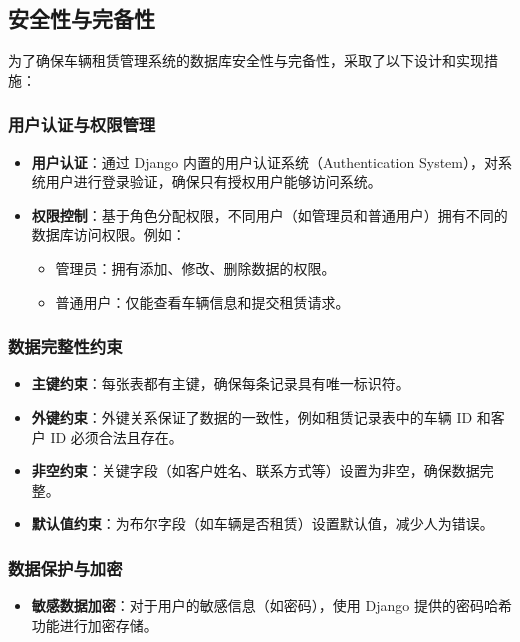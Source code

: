 \documentclass[UTF8,a4paper,12pt]{ctexart}
\begin{document}
\subsection{安全性与完备性}


为了确保车辆租赁管理系统的数据库安全性与完备性，采取了以下设计和实现措施：

\subsubsection{用户认证与权限管理}
\begin{itemize}
    \item \textbf{用户认证}：通过 Django 内置的用户认证系统（Authentication System），对系统用户进行登录验证，确保只有授权用户能够访问系统。
    \item \textbf{权限控制}：基于角色分配权限，不同用户（如管理员和普通用户）拥有不同的数据库访问权限。例如：
    \begin{itemize}
        \item 管理员：拥有添加、修改、删除数据的权限。
        \item 普通用户：仅能查看车辆信息和提交租赁请求。
    \end{itemize}
\end{itemize}

\subsubsection{数据完整性约束}
\begin{itemize}
    \item \textbf{主键约束}：每张表都有主键，确保每条记录具有唯一标识符。
    \item \textbf{外键约束}：外键关系保证了数据的一致性，例如租赁记录表中的车辆 ID 和客户 ID 必须合法且存在。
    \item \textbf{非空约束}：关键字段（如客户姓名、联系方式等）设置为非空，确保数据完整。
    \item \textbf{默认值约束}：为布尔字段（如车辆是否租赁）设置默认值，减少人为错误。
\end{itemize}

\subsubsection{数据保护与加密}
\begin{itemize}
    \item \textbf{敏感数据加密}：对于用户的敏感信息（如密码），使用 Django 提供的密码哈希功能进行加密存储。
\end{itemize}
\end{document}

